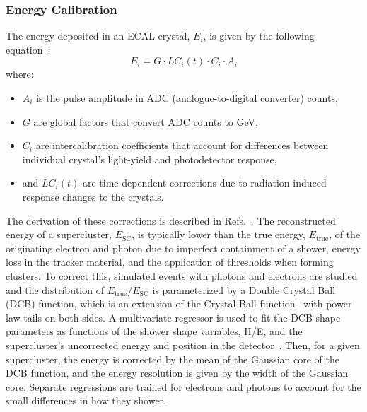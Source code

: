 \subsubsection{Energy Calibration}\label{sec:eg_energy_calibration}

The energy deposited in an ECAL crystal, $E_i$, is given by the following equation~\cite{CMS:2024ppo}:
\begin{equation}
  E_i = G \cdot LC_i(t) \cdot C_i \cdot A_i
\end{equation}
where:
\begin{itemize}
  \item $A_i$ is the pulse amplitude in ADC (analogue-to-digital converter) counts,
  \item $G$ are global factors that convert ADC counts to GeV,
  \item $C_i$ are intercalibration coefficients that account for differences between individual crystal's light-yield and photodetector response,
  \item and $LC_i(t)$ are time-dependent corrections due to radiation-induced response changes to the crystals.
\end{itemize}
The derivation of these corrections is described in Refs.~\cite{CMS:2013lxn,CMS:2024ppo}. The reconstructed energy of a supercluster, $E_{\text{SC}}$, is typically lower than the true energy, $E_{\text{true}}$, of the originating electron and photon due to imperfect containment of a shower, energy loss in the tracker material, and the application of thresholds when forming clusters. To correct this, simulated events with photons and electrons are studied and the distribution of $E_{\text{true}}/E_{\text{SC}}$ is parameterized by a Double Crystal Ball (DCB) function, which is an extension of the Crystal Ball function~\cite{Oreglia:1980cs} with power law tails on both sides. A multivariate regressor is used to fit the DCB shape parameters as functions of the shower shape variables, H/E, and the supercluster's uncorrected energy and position in the detector~\cite{CMS:2014afl}. Then, for a given supercluster, the energy is corrected by the mean of the Gaussian core of the DCB function, and the energy resolution is given by the width of the Gaussian core. Separate regressions are trained for electrons and photons to account for the small differences in how they shower.

